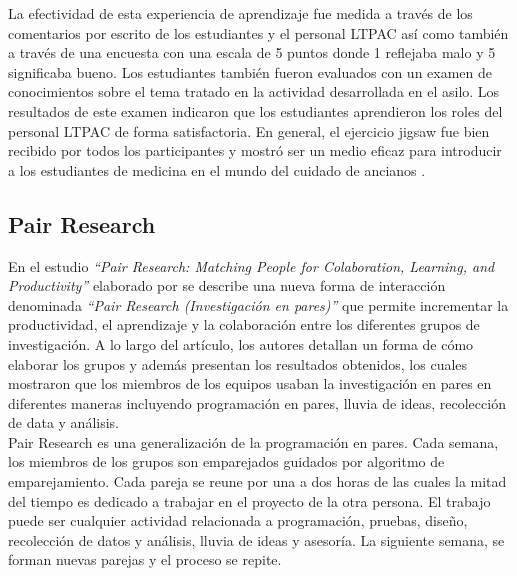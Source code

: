 La efectividad de esta experiencia de aprendizaje fue medida a través de los comentarios por escrito de los estudiantes y el personal LTPAC así como también a través de una encuesta con una escala de 5 puntos donde 1 reflejaba malo y 5 significaba bueno. Los estudiantes también fueron evaluados con un examen de conocimientos sobre el tema tratado en la actividad desarrollada en el asilo. Los resultados de este examen indicaron que los estudiantes aprendieron los roles del personal LTPAC de forma satisfactoria. En general, el ejercicio jigsaw fue bien recibido por todos los participantes y mostró ser un medio eficaz para introducir a los estudiantes de medicina en el mundo del cuidado de ancianos \cite{Buhr2014429}.\\

\subsection{Pair Research}
En el estudio \emph{``Pair Research: Matching People for Colaboration, Learning, and Productivity''} elaborado por  se describe una nueva forma de interacción denominada \emph{``Pair Research (Investigación en pares)''} que permite incrementar la productividad, el aprendizaje y la colaboración entre los diferentes grupos de investigación. A lo largo del artículo, los autores detallan un forma de cómo elaborar los grupos y además presentan los resultados obtenidos, los cuales mostraron que los miembros de los equipos usaban la investigación en pares en diferentes maneras incluyendo programación en pares, lluvia de ideas, recolección de data y análisis.\\

Pair Research es una generalización de la programación en pares. Cada semana, los miembros de los grupos son emparejados guidados por algoritmo de emparejamiento. Cada pareja se reune por una a dos horas de las cuales la mitad del tiempo es dedicado a trabajar en el proyecto de la otra persona. El trabajo puede ser cualquier actividad relacionada a programación, pruebas, diseño, recolección de datos y análisis, lluvia de ideas y asesoría. La siguiente semana, se forman nuevas parejas y el proceso se repite.\\

